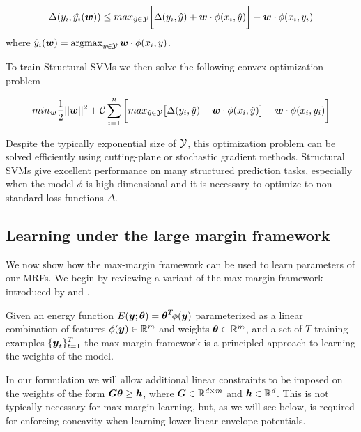 \begin{align}
  \label{eq:ssvm_bound}
  \Delta(y_i,\hat{ y_i }({\boldsymbol{w}}))\leq max_{\hat{y}\in{\cal Y}}\bigg[\Delta(y_i,\hat{ y })+{\boldsymbol{w}}\cdot\phi(x_i,\hat{y})\bigg]-{\boldsymbol{w}}\cdot\phi(x_i,y_i)
\end{align}
\noindent where $\hat{y}_i({\boldsymbol{w}})=\mathop{\textrm{argmax}}_{y\in{\cal Y}}{\boldsymbol{w}}\cdot\phi(x_i,y)$.

To train Structural SVMs we then solve the following convex
optimization problem

\begin{align}
  \label{eq:ssvm_objective}
  min_{{\boldsymbol{w}}}\frac{1}{2}||{\boldsymbol{w}}||^2+{\cal C}\sum_{i=1}^{n}\bigg[max_{\hat{y}\in{\cal Y}}\big[\Delta(y_i,\hat{ y })+{\boldsymbol{w}}\cdot\phi(x_i,\hat{y})\big]-{\boldsymbol{w}}\cdot\phi(x_i,y_i)\bigg]
\end{align}

Despite the typically exponential size of ${\cal Y}$, this optimization
problem can be solved efficiently using cutting-plane or
stochastic gradient methods. Structural SVMs give excellent
performance on many structured prediction tasks, especially when
the model $\phi$ is high-dimensional and it is necessary to
optimize to non-standard loss functions $\Delta$.

\subsection{Learning under the large margin framework}
\label{sec:large_margin}

We now show how the max-margin framework can be used to learn
parameters of our MRFs. We begin by reviewing a variant of the
max-margin framework introduced by
 and .

Given an energy function $E\!\left({\boldsymbol{y}}; \boldsymbol{\theta}\right) = \boldsymbol{\theta}^T \!
\phi({\boldsymbol{y}})$ parameterized as a linear combination of features
$\phi({\boldsymbol{y}}) \in \mathbb{R}^m$ and weights $\boldsymbol{\theta} \in \mathbb{R}^m$, and
a set of $T$ training examples $\{{\boldsymbol{y}}_t\}_{t=1}^T$ the max-margin
framework is a principled approach to learning the weights of the
model.

In our formulation we will allow additional linear constraints to be
imposed on the weights of the form ${\boldsymbol{G}} \boldsymbol{\theta} \geq {\boldsymbol{h}}$, where ${\boldsymbol{G}}
\in \mathbb{R}^{d \times m}$ and ${\boldsymbol{h}} \in \mathbb{R}^d$. This is not typically
necessary for max-margin learning, but, as we will see below, is
required for enforcing concavity when learning lower linear envelope
potentials.

